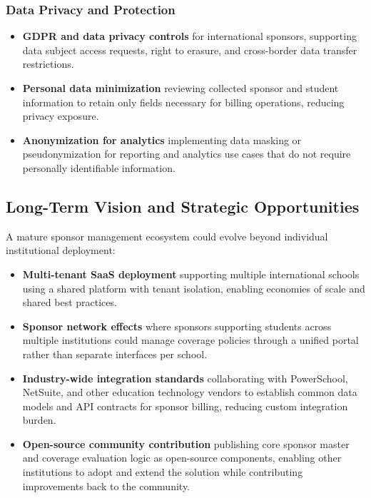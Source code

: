 \subsubsection{Data Privacy and Protection}

\begin{itemize}
    \item \textbf{GDPR and data privacy controls} for international sponsors, supporting data subject access requests, right to erasure, and cross-border data transfer restrictions.
    \item \textbf{Personal data minimization} reviewing collected sponsor and student information to retain only fields necessary for billing operations, reducing privacy exposure.
    \item \textbf{Anonymization for analytics} implementing data masking or pseudonymization for reporting and analytics use cases that do not require personally identifiable information.
\end{itemize}

\subsection{Long-Term Vision and Strategic Opportunities}

A mature sponsor management ecosystem could evolve beyond individual institutional deployment:

\begin{itemize}
    \item \textbf{Multi-tenant SaaS deployment} supporting multiple international schools using a shared platform with tenant isolation, enabling economies of scale and shared best practices.
    \item \textbf{Sponsor network effects} where sponsors supporting students across multiple institutions could manage coverage policies through a unified portal rather than separate interfaces per school.
    \item \textbf{Industry-wide integration standards} collaborating with PowerSchool, NetSuite, and other education technology vendors to establish common data models and API contracts for sponsor billing, reducing custom integration burden.
    \item \textbf{Open-source community contribution} publishing core sponsor master and coverage evaluation logic as open-source components, enabling other institutions to adopt and extend the solution while contributing improvements back to the community.
\end{itemize}

